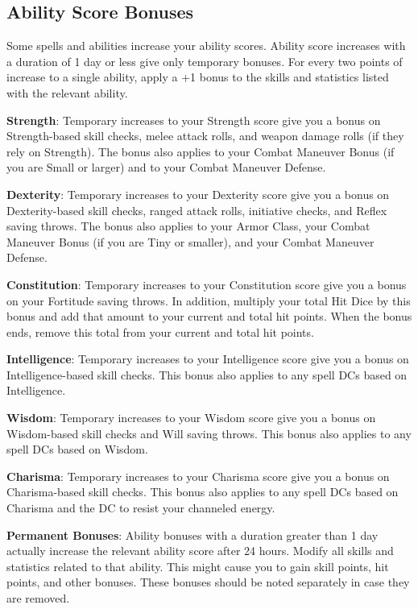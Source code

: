 \subsection{Ability Score Bonuses}

				
Some spells and abilities increase your ability scores. Ability score increases with a duration of 1 day or less give only temporary bonuses. For every two points of increase to a single ability, apply a +1 bonus to the skills and statistics listed with the relevant ability.
				
\textbf{Strength}: Temporary increases to your Strength score give you a bonus on Strength-based skill checks, melee attack rolls, and weapon damage rolls (if they rely on Strength). The bonus also applies to your Combat Maneuver Bonus (if you are Small or larger) and to your Combat Maneuver Defense.
				
\textbf{Dexterity}: Temporary increases to your Dexterity score give you a bonus on Dexterity-based skill checks, ranged attack rolls, initiative checks, and Reflex saving throws. The bonus also applies to your Armor Class, your Combat Maneuver Bonus (if you are Tiny or smaller), and your Combat Maneuver Defense.
				
\textbf{Constitution}: Temporary increases to your Constitution score give you a bonus on your Fortitude saving throws. In addition, multiply your total Hit Dice by this bonus and add that amount to your current and total hit points. When the bonus ends, remove this total from your current and total hit points.
				
\textbf{Intelligence}: Temporary increases to your Intelligence score give you a bonus on Intelligence-based skill checks. This bonus also applies to any spell DCs based on Intelligence.
				
\textbf{Wisdom}: Temporary increases to your Wisdom score give you a bonus on Wisdom-based skill checks and Will saving throws. This bonus also applies to any spell DCs based on Wisdom.
				
\textbf{Charisma}: Temporary increases to your Charisma score give you a bonus on Charisma-based skill checks. This bonus also applies to any spell DCs based on Charisma and the DC to resist your channeled energy.
				
\textbf{Permanent Bonuses}: Ability bonuses with a duration greater than 1 day actually increase the relevant ability score after 24 hours. Modify all skills and statistics related to that ability. This might cause you to gain skill points, hit points, and other bonuses. These bonuses should be noted separately in case they are removed.
												
